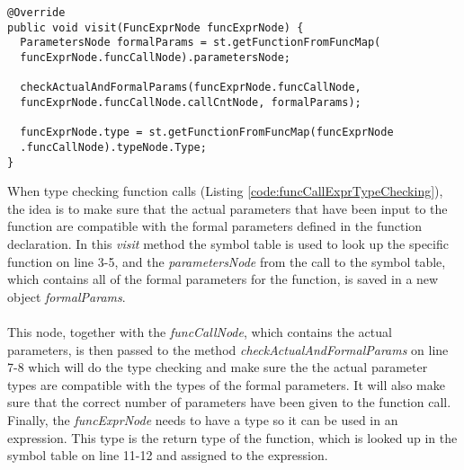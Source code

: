 \begin{lstlisting}[caption={Type checking for function calls as expressions}, label={code:funcCallExprTypeChecking}]
@Override
public void visit(FuncExprNode funcExprNode) {
  ParametersNode formalParams = st.getFunctionFromFuncMap(
  funcExprNode.funcCallNode).parametersNode;

  checkActualAndFormalParams(funcExprNode.funcCallNode, 
  funcExprNode.funcCallNode.callCntNode, formalParams);

  funcExprNode.type = st.getFunctionFromFuncMap(funcExprNode
  .funcCallNode).typeNode.Type;
}
\end{lstlisting}
When type checking function calls (Listing \ref{code:funcCallExprTypeChecking}), the idea is to make sure that the actual parameters that have been input to the function are compatible with the formal parameters defined in the function declaration. 
In this \textit{visit} method the symbol table is used to look up the specific function on line 3-5, and the \textit{parametersNode} from the call to the symbol table, which contains all of the formal parameters for the function, is saved in a new object \textit{formalParams}. 
\\\\
This node, together with the \textit{funcCallNode}, which contains the actual parameters, is then passed to the method \textit{checkActualAndFormalParams} on line 7-8 which will do the type checking and make sure the the actual parameter types are compatible with the types of the formal parameters. 
It will also make sure that the correct number of parameters have been given to the function call. 
Finally, the \textit{funcExprNode} needs to have a type so it can be used in an expression. This type is the return type of the function, which is looked up in the symbol table on line 11-12 and assigned to the expression.